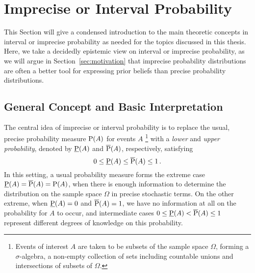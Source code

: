 

\section{Imprecise or Interval Probability}
\label{sec:ip-intro}

This Section will give a condensed introduction to the main theoretic concepts
in interval or imprecise probability as needed for the topics discussed in this thesis.
Here, we take a decidedly epistemic view on interval or imprecise probability,
as we will argue in Section~\ref{sec:motivation}
that imprecise probability distributions are often a better tool for expressing prior beliefs
than precise probability distributions.



\subsection{General Concept and Basic Interpretation}
\label{sec:ip-general}

The central idea of imprecise or interval probability \parencite{1991:walley, 2001:weichselberger, 2011:IESS-ip} is
to replace the usual, precise probability measure $\operatorname{P}(A)$ for events $A$%
\footnote{Events of interest $A$ are taken to be subsets of the sample space $\Omega$,
forming a $\sigma$-algebra, a non-empty collection of sets including countable unions and intersections of subsets of $\Omega$.}
with a \emph{lower} and \emph{upper probability}, denoted by $\underline{\operatorname{P}}(A)$ and $\overline{\operatorname{P}}(A)$, respectively,
satisfying
\begin{equation}
\label{eq:0ip1}
0 \le \underline{\operatorname{P}}(A) \le \overline{\operatorname{P}}(A) \le 1\,.
\end{equation}
In this setting, a usual probability measure forms the extreme case $\underline{\operatorname{P}}(A) = \overline{\operatorname{P}}(A) = \operatorname{P}(A)$,
when there is enough information to determine the distribution on the sample space $\Omega$
in precise stochastic terms.
On the other extreme, when $\underline{\operatorname{P}}(A) = 0$ and $\overline{\operatorname{P}}(A) = 1$,
we have no information at all on the probability for $A$ to occur,
and intermediate cases $0 \le \underline{\operatorname{P}}(A) < \overline{\operatorname{P}}(A) \le 1$ represent
different degrees of knowledge on this probability.

